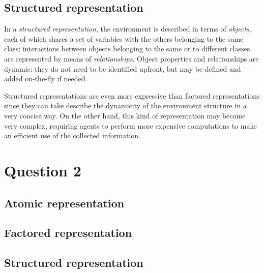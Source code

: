 \documentclass[letterpaper,headings=standardclasses]{scrartcl}
\begin{document}
\subsection{Structured representation}

In a \emph{structured representation}, the environment is described in terms of \emph{objects}, each of which shares a set of variables with the others belonging to the same class; interactions between objects belonging to the same or to different classes are represented by means of \emph{relationships}. Object properties and relationships are dynamic: they do not need to be identified upfront, but may be defined and added on-the-fly if needed.

Structured representations are even more expressive than factored representations since they can take describe the dynamicity of the environment structure in a very concise way. On the other hand, this kind of representation may become very complex, requiring agents to perform more expensive computations to make an efficient use of the collected information.

\section{Question 2}

\subsection{Atomic representation}



\subsection{Factored representation}



\subsection{Structured representation}
\end{document}

